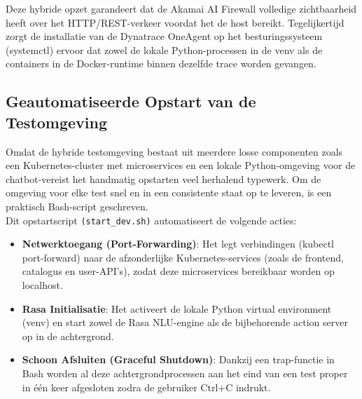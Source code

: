 Deze hybride opzet garandeert dat de Akamai AI Firewall volledige zichtbaarheid heeft over het HTTP/REST-verkeer voordat het de host bereikt. Tegelijkertijd zorgt de installatie van de Dynatrace OneAgent op het besturingssysteem (systemctl) ervoor dat zowel de lokale Python-processen in de venv als de containers in de Docker-runtime binnen dezelfde trace worden gevangen.

\subsection{Geautomatiseerde Opstart van de Testomgeving}

Omdat de hybride testomgeving bestaat uit meerdere losse componenten zoals een Kubernetes-cluster met microservices en een lokale Python-omgeving voor de chatbot-vereist het handmatig opstarten veel herhalend typewerk. Om de omgeving voor elke test snel en in een consistente staat op te leveren, is een praktisch Bash-script geschreven.\\

Dit opstartscript \texttt{(start\_dev.sh)} automatiseert de volgende acties:

\begin{itemize}
    \item \textbf{Netwerktoegang (Port-Forwarding)}: Het legt verbindingen (kubectl port-forward) naar de afzonderlijke Kubernetes-services (zoals de frontend, catalogus en user-API's), zodat deze microservices bereikbaar worden op localhost.
    \item \textbf{Rasa Initialisatie}: Het activeert de lokale Python virtual environment (venv) en start zowel de Rasa NLU-engine als de bijbehorende action server op in de achtergrond.
    \item \textbf{Schoon Afsluiten (Graceful Shutdown)}: Dankzij een trap-functie in Bash worden al deze achtergrondprocessen aan het eind van een test proper in één keer afgesloten zodra de gebruiker Ctrl+C indrukt.
\end{itemize}

